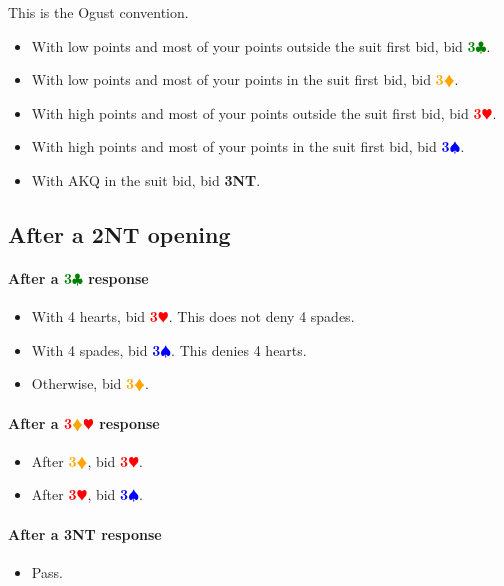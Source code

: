 \documentclass{article}
\newcommand{\Hs}{\textcolor{Red}{$\varheart$}}
\newcommand{\Ss}{\textcolor{Blue}{$\spadesuit$}}
\newcommand{\Ds}{\textcolor{Orange}{$\vardiamond$}}
\newcommand{\Cs}{\textcolor{Green}{$\clubsuit$}}
\newcommand{\NTs}{\textbf{\footnotesize{NT}}}
\renewcommand{\H}[1]{\textcolor{Red}{\textbf{#1}\Hs}}
\renewcommand{\S}[1]{\textcolor{Blue}{\textbf{#1}\Ss}}
\newcommand{\D}[1]{\textcolor{Orange}{\textbf{#1}\Ds}}
\newcommand{\C}[1]{\textcolor{Green}{\textbf{#1}\Cs}}
\newcommand{\NT}[1]{\textbf{#1\NTs}}
\newcommand{\reds}[1]{\textcolor{Red}{\textbf{#1}}\Ds\Hs}
\begin{document}
This is the Ogust convention.

\begin{itemize}
\item With low points and most of your points outside the suit first bid, bid \C{3}.
\item With low points and most of your points in the suit first bid, bid \D{3}.
\item With high points and most of your points outside the suit first bid, bid \H{3}.
\item With high points and most of your points in the suit first bid, bid \S{3}.
\item With AKQ in the suit bid, bid \NT{3}.
\end{itemize}

\subsection{After a \NT{2} opening}

\paragraph{After a \C{3} response}

\begin{itemize}
\item With 4 hearts, bid \H{3}. This does not deny 4 spades.
\item With 4 spades, bid \S{3}. This denies 4 hearts.
\item Otherwise, bid \D{3}.
\end{itemize}

\paragraph{After a \reds{3} response}

\begin{itemize}
\item After \D{3}, bid \H{3}.
\item After \H{3}, bid \S{3}.
\end{itemize}

\paragraph{After a \NT{3} response}

\begin{itemize}
\item Pass.
\end{itemize}
\end{document}
